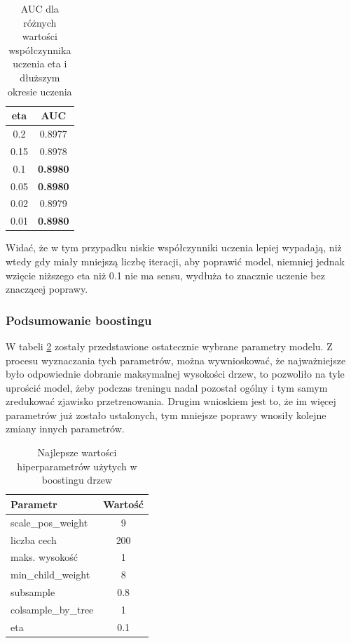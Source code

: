 \documentclass[12pt]{article}
\begin{document}
\begin{table}[h]
    \centering
    \begin{tabular}{|c|c|}
    \hline
        eta & AUC \\ \hline
        0.2 & 0.8977 \\ \hline 
        0.15 & 0.8978 \\ \hline 
        0.1 & \textbf{0.8980} \\ \hline 
        0.05 & \textbf{0.8980} \\ \hline 
        0.02 & 0.8979 \\ \hline 
        0.01 & \textbf{0.8980} \\ \hline 
    \end{tabular}
    \caption{AUC dla różnych wartości współczynnika uczenia eta i dłuższym okresie uczenia}
    \label{tab:xgboost_eta_longer}
\end{table}

Widać, że w tym przypadku niskie współczynniki uczenia lepiej wypadają, niż wtedy gdy miały mniejszą liczbę iteracji, aby poprawić model, niemniej jednak wzięcie niższego eta niż 0.1 nie ma sensu, wydłuża to znacznie uczenie bez znaczącej poprawy.

\subsubsection{Podsumowanie boostingu}

W tabeli \ref{tab:xgboost_best_params} zostały przedstawione ostatecznie wybrane parametry modelu. Z procesu wyznaczania tych parametrów, można wywnioskować, że najważniejsze było odpowiednie dobranie maksymalnej wysokości drzew, to pozwoliło na tyle uprościć model, żeby podczas treningu nadal pozostał ogólny i tym samym zredukować zjawisko przetrenowania. Drugim wnioskiem jest to, że im więcej parametrów już zostało ustalonych, tym mniejsze poprawy wnosiły kolejne zmiany innych parametrów. 

\begin{table}[h]
    \centering
    \begin{tabular}{l | c }
        Parametr & Wartość \\ \hline
        scale\_pos\_weight & 9 \\
        liczba cech & 200 \\
        maks. wysokość & 1 \\
        min\_child\_weight & 8 \\
        subsample & 0.8 \\
        colsample\_by\_tree & 1 \\
        eta & 0.1 \\
    \end{tabular}
    \caption{Najlepsze wartości hiperparametrów użytych w boostingu drzew}
    \label{tab:xgboost_best_params}
\end{table}
\end{document}
